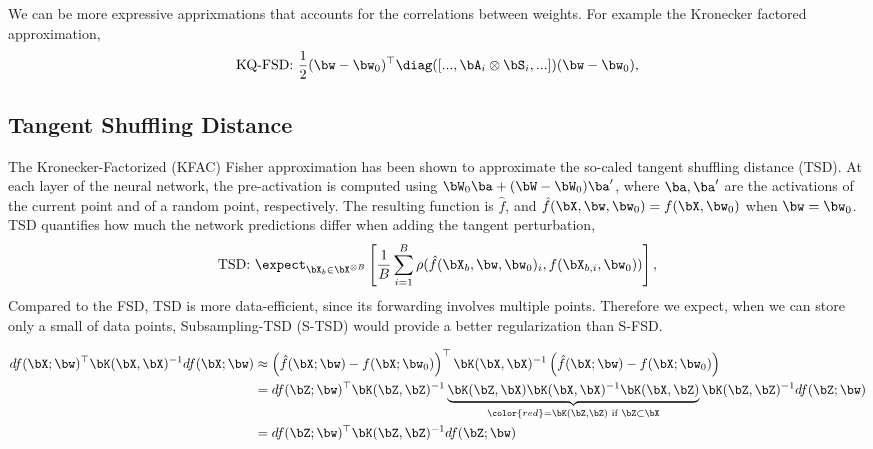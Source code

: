 We can be more expressive apprixmations that accounts for the correlations between weights. For example the Kronecker factored approximation,
\begin{align}
    \text{KQ-FSD: } \frac{1}{2}(\bw - \bw_0)^{\top} \diag([...,\bA_i \otimes \bS_i, ...]) (\bw - \bw_0),
\end{align}

\subsection{Tangent Shuffling Distance}
The Kronecker-Factorized (KFAC) Fisher approximation has been shown to approximate the so-caled tangent shuffling distance (TSD). At each layer of the neural network, the pre-activation is computed using $\bW_0 \ba + (\bW - \bW_0) \ba'$, where $\ba, \ba'$ are the activations of the current point and of a random point, respectively. The resulting function is $\hat{f}$, and $\hat{f}(\bX, \bw, \bw_0) = f(\bX, \bw_0)$ when $\bw = \bw_0$. TSD quantifies how much the network predictions differ when adding the tangent perturbation,
\begin{align}
    \text{TSD: } \expect_{\bX_b \in \bX^{\otimes B}} \left[ \frac{1}{B}\sum_{i=1}^B \rho(\hat{f}(\bX_b, \bw, \bw_0)_i, f(\bX_{b,i}, \bw_0)) \right],
\end{align}
Compared to the FSD, TSD is more data-efficient, since its forwarding involves multiple points. Therefore we expect, when we can store only a small of data points, Subsampling-TSD (S-TSD) would provide a better regularization than S-FSD.

\begin{align}
    df(\bX; \bw)^{\top}\bK(\bX, \bX)^{-1} df(\bX; \bw) 
    &\approx \left(\hat{f}(\bX; \bw)-f(\bX; \bw_0)\right)^{\top}\bK(\bX, \bX)^{-1} \left(\hat{f}(\bX; \bw)-f(\bX; \bw_0)\right) \notag \\
    &=df(\bZ; \bw)^{\top} \bK(\bZ, \bZ)^{-1}\underbrace{\bK(\bZ, \bX)\bK(\bX, \bX)^{-1}\bK(\bX, \bZ)}_{\color{red} =\bK(\bZ, \bZ) \text{ if } \bZ \subset \bX} \bK(\bZ, \bZ)^{-1} df(\bZ; \bw) \notag \\
    &= df(\bZ; \bw)^{\top}\bK(\bZ, \bZ)^{-1} df(\bZ; \bw)  \notag 
\end{align}



